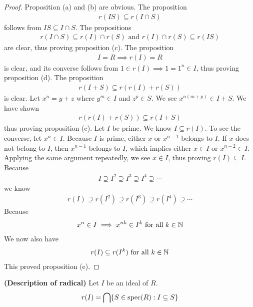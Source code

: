 \documentclass{report}
\begin{document}
\begin{proof}
Proposition (a) and (b) are obvious. The proposition
\begin{align*}
r(IS)\subseteq r(I\cap S) 
\end{align*}
follows from $IS \subseteq I \cap S$. The propositions 
\begin{align*}
r(I \cap S)\subseteq r(I)\cap r(S)\text{ and }r(I) \cap r(S) \subseteq r(IS)
\end{align*}
are clear, thus proving proposition (c). The proposition 
\begin{align*}
I=R \implies  r(I)=R 
\end{align*}
is clear, and its converse follows from $1\in r(I)\implies 1=1^n \in I$, thus proving proposition (d). The proposition 
\begin{align*}
r(I+S)\subseteq r(r(I)+r(S))
\end{align*}
is clear. Let $x^n=y+z$ where  $y^m \in I$ and $z^p \in S$. We see $x^{n(m+p)}\in I+S$. We have shown 
\begin{align*}
r(r(I)+r(S)) \subseteq r(I+S)
\end{align*}
thus proving proposition (e). Let $I$ be prime. We know $I \subseteq r(I)$. To see the converse, let $x^n \in I$. Because $I$ is prime, either  $x$ or  $x^{n-1}$ belongs to $I$. If  $x$ does not belong to  $I$, then  $x^{n-1}$ belongs to $I$, which implies either $x\in I$ or $x^{n-2}\in I$. Applying the same argument repeatedly, we see $x \in I$, thus proving $r(I)\subseteq I$. Because 
\begin{align*}
I \supseteq I^2 \supseteq I^3 \supseteq I^4 \supseteq \cdots   
\end{align*}
we know
\begin{align*}
r(I) \supseteq r(I^2) \supseteq r(I^3) \supseteq r(I^4) \supseteq \cdots  
\end{align*}
Because 
\begin{align*}
x^n \in I \implies  x^{nk} \in I^k \text{ for all }k \in\mathbb{N}
\end{align*}
We now also have 
\begin{align*}
r(I) \subseteq r(I^k)\text{ for all }k  \in\mathbb{N}
\end{align*}
This proved proposition (e). 
\end{proof}
\begin{theorem}
\textbf{(Description of radical)}  Let $I$ be an ideal of $R$. 
\begin{align*}
r(I)= \bigcap \{ S \in \operatorname{spec}(R): I \subseteq S \}
\end{align*}
\end{theorem}
\end{document}
